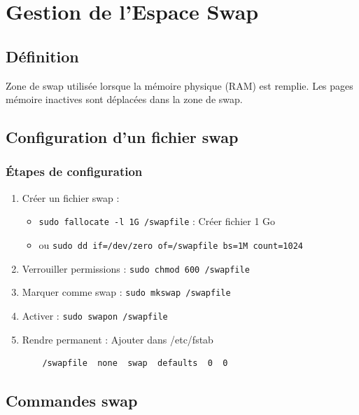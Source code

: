 \documentclass[12pt,a4paper]{article}
\begin{document}

\section{Gestion de l'Espace Swap}

\subsection{Définition}

Zone de swap utilisée lorsque la mémoire physique (RAM) est remplie. Les pages mémoire inactives sont déplacées dans la zone de swap.

\subsection{Configuration d'un fichier swap}

\subsubsection{Étapes de configuration}
\begin{enumerate}
    \item Créer un fichier swap :
    \begin{itemize}
        \item \texttt{sudo fallocate -l 1G /swapfile} : Créer fichier 1 Go
        \item ou \texttt{sudo dd if=/dev/zero of=/swapfile bs=1M count=1024}
    \end{itemize}
    \item Verrouiller permissions : \texttt{sudo chmod 600 /swapfile}
    \item Marquer comme swap : \texttt{sudo mkswap /swapfile}
    \item Activer : \texttt{sudo swapon /swapfile}
    \item Rendre permanent : Ajouter dans /etc/fstab
    \begin{verbatim}
    /swapfile  none  swap  defaults  0  0
    \end{verbatim}
\end{enumerate}

\subsection{Commandes swap}
\end{document}
